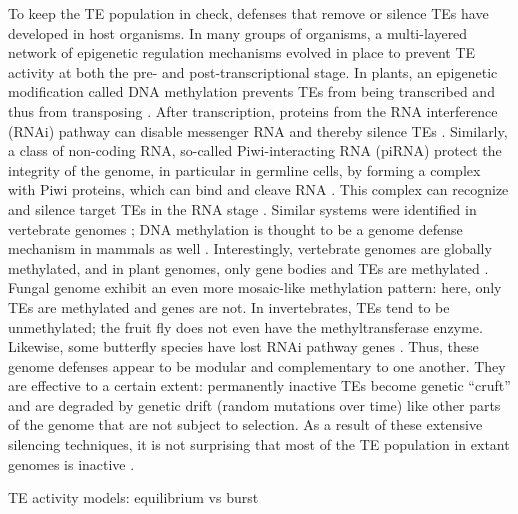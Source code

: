 To keep the TE population in check, defenses that remove or silence TEs
have developed in host organisms. In many groups of organisms, a
multi-layered network of epigenetic regulation mechanisms evolved in
place to prevent TE activity at both the pre- and post-transcriptional
stage. In plants, an epigenetic modification called DNA methylation
prevents TEs from being transcribed and thus from transposing
\citep{Slotkin2007, Lisch2009}. After transcription, proteins from the
RNA interference (RNAi) pathway can disable messenger RNA and thereby
silence TEs \citep{Buchon2006}. Similarly, a class of non-coding RNA,
so-called Piwi-interacting RNA (piRNA) protect the integrity of the
genome, in particular in germline cells, by forming a complex with Piwi
proteins, which can bind and cleave RNA \citep{Zeng2011}. This complex
can recognize and silence target TEs in the RNA stage \citep{Siomi2011}.
Similar systems were identified in vertebrate genomes \citep{Suzuki2008,
Schubeler2015}; DNA methylation is thought to be a genome defense
mechanism in mammals as well \citep{Yoder1997}. Interestingly,
vertebrate genomes are globally methylated, and in plant genomes, only
gene bodies and TEs are methylated \citep{Suzuki2008}. Fungal genome
exhibit an even more mosaic-like methylation pattern: here, only TEs are
methylated and genes are not. In invertebrates, TEs tend to be
unmethylated; the fruit fly  does not
even have the methyltransferase enzyme. Likewise, some butterfly species
have lost RNAi pathway genes \citep{Pauli2016}. Thus, these genome
defenses appear to be modular and complementary to one another. They are
effective to a certain extent: permanently inactive TEs become genetic
``cruft'' and are degraded by genetic drift (random mutations over time)
like other parts of the genome that are not subject to selection. As a
result of these extensive silencing techniques, it is not surprising
that most of the TE population in extant genomes is inactive
\citep{Yoder1997, Zilberman2007}.

TE activity models: equilibrium vs burst

